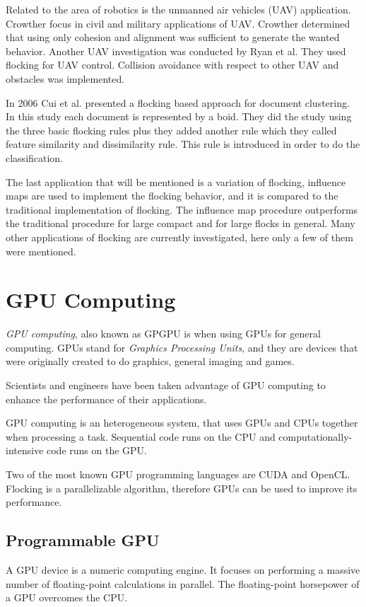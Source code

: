 Related to the area of robotics is the unmanned air vehicles (UAV) application. Crowther focus in civil and military applications of  UAV\cite{flockingUAV}. Crowther determined that using only cohesion and alignment was sufficient to generate the wanted behavior. Another UAV investigation was conducted by Ryan et al\cite{UAVControl}. They used flocking for UAV control. Collision avoidance with respect to other UAV and obstacles was implemented.

In 2006 Cui et al. presented a flocking based approach for document clustering\cite{document1}. In this study each document is represented by a boid. They did the study using the three basic flocking rules plus they added another rule which they called feature similarity and dissimilarity rule. This rule is introduced in order to do the classification. 

The last application that will be mentioned is a variation of flocking, influence maps are used to implement the flocking behavior, and it is compared to the traditional implementation of flocking\cite{flockingInfluenceMaps}. The influence map procedure outperforms the traditional procedure for large compact and for large flocks in general. Many other applications of flocking are currently investigated, here only a few of them were mentioned.

\section{GPU Computing}
\textit{GPU computing}, also known as GPGPU is when using GPUs for general computing. GPUs stand for \textit{Graphics Processing Units}, and they are devices that were originally created to do graphics, general imaging and games. 

Scientists and engineers have been taken advantage of GPU computing to enhance the performance of their applications.

GPU computing is an heterogeneous system, that uses GPUs and CPUs together when processing a task. Sequential code runs on the CPU and computationally-intensive code runs on the GPU.

Two of the most known GPU programming languages are CUDA and OpenCL. Flocking is a parallelizable algorithm, therefore GPUs can be used to improve its performance.


\subsection{Programmable GPU}
A GPU device is a numeric computing engine\cite{GPUbook}. It focuses on performing a massive number of floating-point calculations in parallel. The floating-point horsepower of a GPU overcomes the CPU.  

